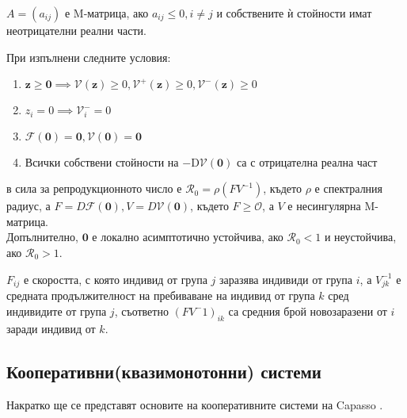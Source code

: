 \begin{definition}[M-матрица]
  $A = (a_{ij})$ е M-матрица, ако $a_{ij} \leq 0, i \neq j$ и собствените ѝ стойности имат неотрицателни реални части.
\end{definition}
\begin{theorem}
  При изпълнени следните условия:
  \begin{enumerate}
    \item $\mathbf{z} \geq \mathbf{0} \implies \mathscr{V}(\mathbf{z}) \geq 0, \mathscr{V}^+(\mathbf{z}) \geq 0, \mathscr{V}^-(\mathbf{z}) \geq 0$
    \item $z_i = 0 \implies \mathscr{V}_{i}^- = 0$
    \item $\mathscr{F}(\mathbf{0}) = \mathbf{0}, \mathscr{V}(\mathbf{0}) = \mathbf{0}$
    \item Всички собствени стойности на $-\mathrm{D}\mathscr{V}{(\boldsymbol{0})}$ са с отрицателна реална част
  \end{enumerate}
  в сила за репродукционното число е $\mathscr{R}_0 = \rho(F V^{-1})$, където $\rho$ е спектралния радиус, а $F = D\mathscr{F}(\mathbf{0}), V = D\mathscr{V}(\mathbf{0})$, където $F \geq \mathscr{O}$, а $V$ е несингулярна M-матрица. \\
  Допълнително, $\mathbf{0}$ е локално асимптотично устойчива, ако $\mathscr{R}_0 < 1$ и неустойчива, ако $\mathscr{R}_0 > 1$.
\end{theorem}

$F_{ij}$ е скоростта, с която индивид от група $j$ заразява индивиди от група $i$, а $V^{-1}_{jk}$ е средната продължителност на пребиваване на индивид от група $k$ сред индивидите от група $j$, съответно $(F V^-1)_{ik}$ са средния брой новозаразени от $i$ заради индивид от $k$.

\subsection{Кооперативни(квазимонотонни) системи}
Накратко ще се представят основите на кооперативните системи на Capasso \cite{Capasso2008}.

